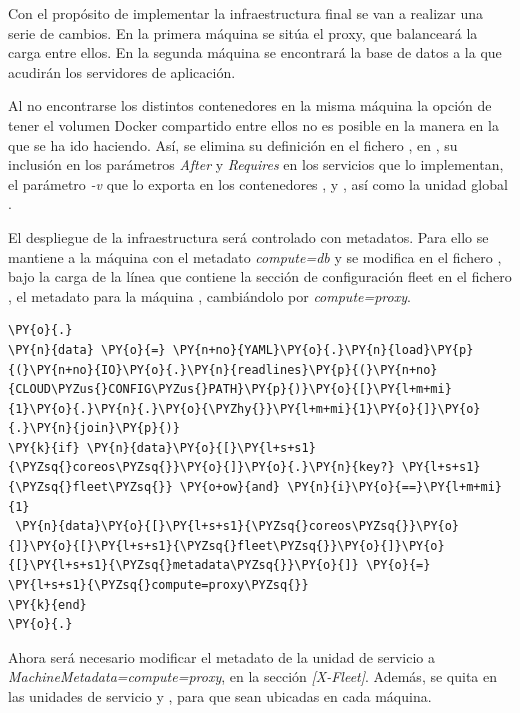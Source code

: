 Con el propósito de implementar la infraestructura final se van a realizar una serie de cambios. En la primera máquina se sitúa el proxy, que balanceará la carga entre ellos. En la segunda máquina se encontrará la base de datos a la que acudirán los servidores de aplicación.

Al no encontrarse los distintos contenedores en la misma máquina la opción de tener el volumen Docker  compartido entre ellos no es posible en la manera en la que se ha ido haciendo. Así, se elimina su definición en el fichero , en , su inclusión en los parámetros \textit{After} y \textit{Requires} en los servicios que lo implementan, el parámetro \textit{-v} que lo exporta en los contenedores ,  y , así como la unidad global .

El despliegue de la infraestructura será controlado con metadatos. Para ello se mantiene a la máquina  con el metadato \textit{compute=db} y se modifica en el fichero , bajo la carga de la línea que contiene la sección de configuración fleet en el fichero , el metadato para la máquina , cambiándolo por \textit{compute=proxy}.

\begin{codelisting}
\label{code:vagrantfile2}
\begin{Verbatim}[fontsize=\relsize{-2.5},fontseries=b,commandchars=\\\{\}]
\PY{o}{.}
\PY{n}{data} \PY{o}{=} \PY{n+no}{YAML}\PY{o}{.}\PY{n}{load}\PY{p}{(}\PY{n+no}{IO}\PY{o}{.}\PY{n}{readlines}\PY{p}{(}\PY{n+no}{CLOUD\PYZus{}CONFIG\PYZus{}PATH}\PY{p}{)}\PY{o}{[}\PY{l+m+mi}{1}\PY{o}{.}\PY{n}{.}\PY{o}{\PYZhy{}}\PY{l+m+mi}{1}\PY{o}{]}\PY{o}{.}\PY{n}{join}\PY{p}{)}
\PY{k}{if} \PY{n}{data}\PY{o}{[}\PY{l+s+s1}{\PYZsq{}coreos\PYZsq{}}\PY{o}{]}\PY{o}{.}\PY{n}{key?} \PY{l+s+s1}{\PYZsq{}fleet\PYZsq{}} \PY{o+ow}{and} \PY{n}{i}\PY{o}{==}\PY{l+m+mi}{1}
 \PY{n}{data}\PY{o}{[}\PY{l+s+s1}{\PYZsq{}coreos\PYZsq{}}\PY{o}{]}\PY{o}{[}\PY{l+s+s1}{\PYZsq{}fleet\PYZsq{}}\PY{o}{]}\PY{o}{[}\PY{l+s+s1}{\PYZsq{}metadata\PYZsq{}}\PY{o}{]} \PY{o}{=} \PY{l+s+s1}{\PYZsq{}compute=proxy\PYZsq{}}
\PY{k}{end}
\PY{o}{.}
\end{Verbatim}
\end{codelisting}

Ahora será necesario modificar el metadato de la unidad de servicio  a \textit{MachineMetadata=compute=proxy}, en la sección \textit{[X-Fleet]}. Además, se quita  en las unidades de servicio  y , para que sean ubicadas en cada máquina.


